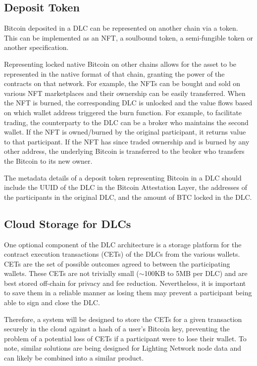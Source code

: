 \documentclass[twoside, a4paper, 11pt]{article}
\begin{document}
  \subsection{Deposit Token}

  Bitcoin deposited in a DLC can be represented on another chain via a token. This can be implemented as an NFT, a soulbound token, a semi-fungible token or another specification.

  Representing locked native Bitcoin on other chains allows for the asset to be represented in the native format of that chain, granting the power of the contracts on that network. For example, the NFTs can be bought and sold on various NFT marketplaces and their ownership can be easily transferred.
  When the NFT is burned, the corresponding DLC is unlocked and the value flows based on which wallet address triggered the burn function. For example, to facilitate trading, the counterparty to the DLC can be a broker who maintains the second wallet. If the NFT is owned/burned by the original participant, it returns value to that participant. If the NFT has since traded ownership and is burned by any other address, the underlying Bitcoin is transferred to the broker who transfers the Bitcoin to its new owner.

  The metadata details of a deposit token representing Bitcoin in a DLC should include the UUID of the DLC in the Bitcoin Attestation Layer, the addresses of the participants in the original DLC, and the amount of BTC locked in the DLC.

  \subsection{Cloud Storage for DLCs}

  One optional component of the DLC architecture is a storage platform for the contract execution transactions (CETs) of the DLCs from the various wallets. CETs are the set of possible outcomes agreed to between the participating wallets. These CETs are not trivially small ($\sim$100KB to 5MB per DLC) and are best stored off-chain for privacy and fee reduction. Nevertheless, it is important to save them in a reliable manner as losing them may prevent a participant being able to sign and close the DLC.

  Therefore, a system will be designed to store the CETs for a given transaction securely in the cloud against a hash of a user’s Bitcoin key, preventing the problem of a potential loss of CETs if a participant were to lose their wallet. To note, similar solutions are being designed for Lighting Network node data and can likely be combined into a similar product.
\end{document}
